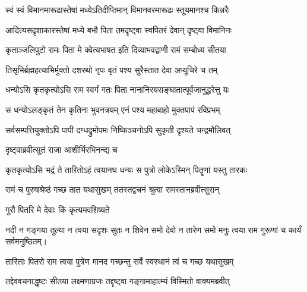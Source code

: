 \twolineshloka
{स्वं स्वं विमानमारूढास्तेषां मध्येऽतिदीप्तिमान्}
{विमानवरमारूढः स्तूयमानश्च किन्नरैः} %

\twolineshloka
{आदित्यसदृशाकारस्तेषां मध्ये बभौ पिता}
{तमदृष्ट्वा स्वपितरं देवान् दृष्ट्वा विमानिनः} %

\twolineshloka
{कृताञ्जलिपुटो रामः पिता मे क्वेत्यभाषत}
{इति दिव्याभवद्वाणी रामं सम्बोध्य सीतया} %

\twolineshloka
{तिसृभिर्ब्रह्महत्याभिर्मुक्तो दशरथो नृपः}
{वृतं पश्य सुरैस्तात देवा अप्यूचिरे च तम्} %



\twolineshloka
{धन्योऽसि कृतकृत्योऽसि राम स्वर्गं गतः पिता}
{नानानिरयसङ्घातात्पूर्वजानुद्धरेत्तु यः} %

\twolineshloka
{स धन्योऽलङ्कृतं तेन कृतिना भुवनत्रयम्}
{एनं पश्य महाबाहो मुक्तपापं रविप्रभम्} %

\twolineshloka
{सर्वसम्पत्तियुक्तोऽपि पापी दग्धद्रुमोपमः}
{निष्किञ्चनोऽपि सुकृती दृश्यते चन्द्रमौलिवत्} %



\onelineshloka
{दृष्ट्वाब्रवीत्सुतं राजा आशीर्भिरभिनन्द्य च}%



\twolineshloka
{कृतकृत्योऽसि भद्रं ते तारितोऽहं त्वयानघ}
{धन्यः स पुत्रो लोकेऽस्मिन् पितॄणां यस्तु तारकः} %



\twolineshloka
{रामं च पुरुषश्रेष्ठं गच्छ तात यथासुखम्}
{ततस्तद्वचनं श्रुत्वा रामस्तानब्रवीत्सुरान्} %



\onelineshloka
{गुरौ पितरि मे देवाः किं कृत्यमवशिष्यते}%



\twolineshloka
{नदी न गङ्गया तुल्या न त्वया सदृशः सुतः}
{न शिवेन समो देवो न तारेण समो मनुः} %
त्वया राम गुरूणां च कार्यं सर्वमनुष्ठितम्।

\twolineshloka
{तारिताः पितरो राम त्वया पुत्रेण मानद}
{गच्छन्तु सर्वे स्वस्थानं त्वं च गच्छ यथासुखम्} %



\twolineshloka
{तद्देववचनाद्धृष्टः सीतया लक्ष्मणाग्रजः}
{तद्दृष्ट्वा गङ्गामाहात्म्यं विस्मितो वाक्यमब्रवीत्} %



